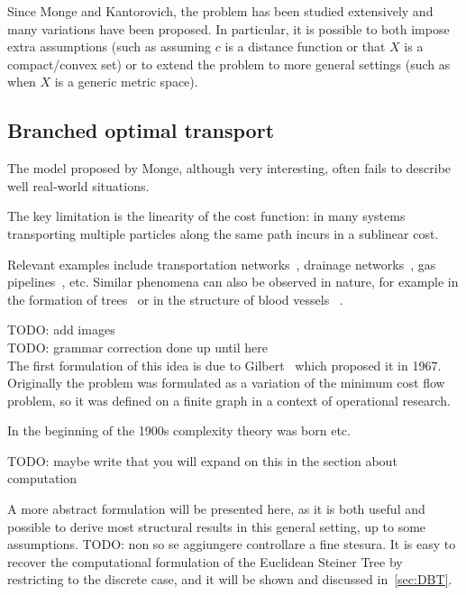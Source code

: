 \documentclass[12pt,a4paper]{article}
\numberwithin{equation}{section}
\theoremstyle{mytheorem}
\theoremstyle{myremark}
\theoremstyle{myparagraph}
\begin{document}
    Since Monge and Kantorovich, the problem has been studied extensively and many variations have been proposed.
    In particular, it is possible to both impose extra assumptions (such as assuming $c$ is a distance function or that $X$ is a compact/convex set) 
    or to extend the problem to more general settings (such as when $X$ is a generic metric space).
    

    \subsection{Branched optimal transport}

    The model proposed by Monge, although very interesting, often fails to describe well real-world situations. 
    
    The key limitation is the linearity of the cost function: in many systems transporting multiple particles along the same path 
    incurs in a sublinear cost.

    Relevant examples include transportation networks~\cite{gilbert1967minimum}, drainage networks~\cite{lee1976low}, gas pipelines~\cite{bhaskaran1979optimal}, etc.
    Similar phenomena can also be observed in nature, for example in the formation of trees~\cite{xia2007formation} or in the structure of blood vessels \cite{west2001general}~\cite{west1997general}.
        
    TODO: add images  \\
    TODO: grammar correction done up until here \\

    The first formulation of this idea is due to Gilbert~\cite{gilbert1967minimum} which proposed it in 1967.
    Originally the problem was formulated as a variation of the minimum cost flow problem, so it was defined on a finite graph in a context of operational research.
    
    In the beginning of the 1900s complexity theory was born etc. 

    \cite{karp2010reducibility}
    TODO: maybe write that you will expand on this in the section about computation


    A more abstract formulation will be presented here, as it is both useful and possible to derive most structural results in this general setting, up to some assumptions.
    TODO: non so se aggiungere controllare a fine stesura. 
    It is easy to recover the computational formulation of the Euclidean Steiner Tree by restricting to the discrete case, and it will be shown and discussed in~\ref{sec:DBT}.
\end{document}
